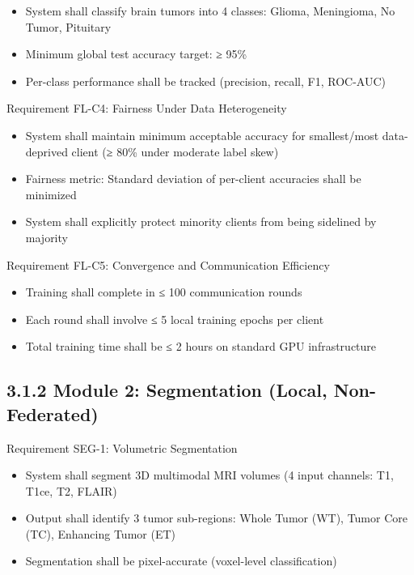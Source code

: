 \begin{itemize}
  \item System shall classify brain tumors into 4 classes: Glioma, Meningioma, No Tumor, Pituitary
  \item Minimum global test accuracy target: ≥ 95\%
  \item Per-class performance shall be tracked (precision, recall, F1, ROC-AUC)
\end{itemize}

Requirement FL-C4: Fairness Under Data Heterogeneity

\begin{itemize}
  \item System shall maintain minimum acceptable accuracy for smallest/most data-deprived client (≥ 80\% under moderate label skew)
  \item Fairness metric: Standard deviation of per-client accuracies shall be minimized
  \item System shall explicitly protect minority clients from being sidelined by majority
\end{itemize}

Requirement FL-C5: Convergence and Communication Efficiency

\begin{itemize}
  \item Training shall complete in ≤ 100 communication rounds
  \item Each round shall involve ≤ 5 local training epochs per client
  \item Total training time shall be ≤ 2 hours on standard GPU infrastructure
\end{itemize}


\subsection{3.1.2 Module 2: Segmentation (Local, Non-Federated)}
Requirement SEG-1: Volumetric Segmentation

\begin{itemize}
  \item System shall segment 3D multimodal MRI volumes (4 input channels: T1, T1ce, T2, FLAIR)
  \item Output shall identify 3 tumor sub-regions: Whole Tumor (WT), Tumor Core (TC), Enhancing Tumor (ET)
  \item Segmentation shall be pixel-accurate (voxel-level classification)
\end{itemize}


